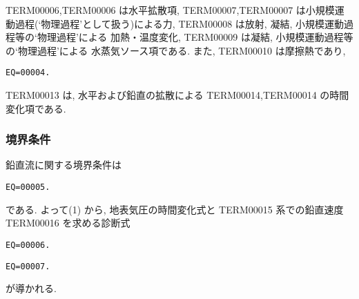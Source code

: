 TERM00006,TERM00006
は水平拡散項,
TERM00007,TERM00007
は小規模運動過程(`物理過程'として扱う)による力,
TERM00008 は放射, 凝結, 小規模運動過程等の`物理過程'による
加熱・温度変化,
TERM00009 は凝結, 小規模運動過程等の`物理過程'による
水蒸気ソース項である.
また, TERM00010 は摩擦熱であり,
%
\begin{verbatim}
EQ=00004.
\end{verbatim}
%
TERM00013 は,
水平および鉛直の拡散による TERM00014,TERM00014 の時間変化項である.

\subsubsection{境界条件}

鉛直流に関する境界条件は
%
\begin{verbatim}
EQ=00005.
\end{verbatim}
%
である. よって(1) から,
地表気圧の時間変化式と
TERM00015 系での鉛直速度 TERM00016 を求める診断式
%
\begin{verbatim}
EQ=00006.
\end{verbatim}
%
\begin{verbatim}
EQ=00007.
\end{verbatim}
%
が導かれる.



